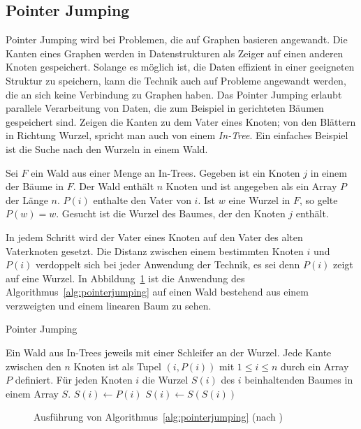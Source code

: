 \subsection{Pointer Jumping}
Pointer Jumping wird bei Problemen, die auf Graphen basieren angewandt.
Die Kanten eines Graphen werden in Datenstrukturen als Zeiger auf einen anderen
Knoten gespeichert.
Solange es möglich ist, die Daten effizient in einer geeigneten Struktur zu
speichern, kann die Technik auch auf Probleme angewandt werden, die an sich
keine Verbindung zu Graphen haben.
Das Pointer Jumping erlaubt parallele Verarbeitung von Daten, die zum Beispiel
in gerichteten Bäumen gespeichert sind.
Zeigen die Kanten zu dem Vater eines Knoten; von den Blättern in Richtung
Wurzel, spricht man auch von einem \emph{In-Tree}.
Ein einfaches Beispiel ist die Suche nach den Wurzeln in einem Wald.
%
\begin{problem}
    Sei $F$ ein Wald aus einer Menge an In-Trees.
    Gegeben ist ein Knoten $j$ in einem der Bäume in $F$.
    Der Wald enthält $n$ Knoten und ist angegeben als ein Array $P$ der Länge
    $n$.
    $P(i)$ enthalte den Vater von $i$.
    Ist $w$ eine Wurzel in $F$, so gelte $P(w) = w$.
    Gesucht ist die Wurzel des Baumes, der den Knoten $j$ enthält.
\end{problem}
%
In jedem Schritt wird der Vater eines Knoten auf den Vater des alten
Vaterknoten gesetzt.
Die Distanz zwischen einem bestimmten Knoten $i$ und $P(i)$ verdoppelt sich bei
jeder Anwendung der Technik, es sei denn $P(i)$ zeigt auf eine Wurzel.
In Abbildung~\ref{fig:pointerjumping} ist die Anwendung des
Algorithmus~\ref{alg:pointerjumping} auf einen Wald bestehend aus einem
verzweigten und einem linearen Baum zu sehen.
%
\begin{algorithm}
    \caption{Pointer Jumping \cite[S.52]{jaja}}
    \label{alg:pointerjumping}
    \begin{algorithmic}[1]
    \Require Ein Wald aus In-Trees jeweils mit einer Schleifer an der Wurzel.
        Jede Kante zwischen den $n$ Knoten ist als Tupel $(i, P(i))$ mit
        $1 \leq i \leq n$ durch ein Array $P$ definiert.
    \Ensure Für jeden Knoten $i$ die Wurzel $S(i)$ des $i$ beinhaltenden
        Baumes in einem Array $S$.
        \State $S(i) \gets P(i)$
            \State $S(i) \gets S(S(i))$
        \EndWhile
    \EndParDo
    \end{algorithmic}
\end{algorithm}
%
\begin{figure}
    \centering
    \subfloat[]{}
    \subfloat[]{}
    \newline
    \subfloat[]{}
    \caption{Ausführung von Algorithmus~\ref{alg:pointerjumping}
    (nach \cite[S.54]{jaja})}
    \label{fig:pointerjumping}
\end{figure}
\cite[S.52ff]{jaja}
